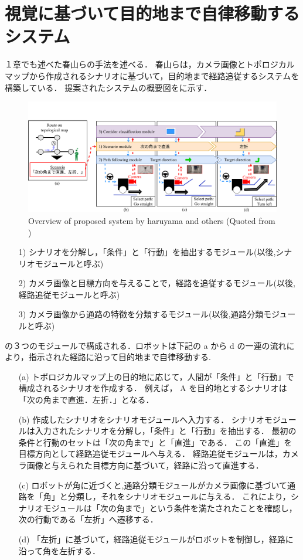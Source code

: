 \section{視覚に基づいて目的地まで自律移動するシステム}
１章でも述べた春山らの手法を述べる．
春山らは，カメラ画像とトポロジカルマップから作成されるシナリオに基づいて，目的地まで経路追従するシステムを構築している．
提案されたシステムの概要図をに示す．

\begin{figure}[htbp]
  \centering
   \includegraphics[width=130mm]{images/pdf/haruyama/system.pdf}
   \caption[Overview of proposed system by haruyama and others]{Overview of proposed system by haruyama and others (Quoted from \cite{haruyama2023})}
   \label{fig:sys}
\end{figure}

\begin{enumerate}
  \item [1)]シナリオを分解し，「条件」と「行動」を抽出するモジュール(以後,シナリオモジュールと呼ぶ)
  \item [2)]カメラ画像と目標方向を与えることで，経路を追従するモジュール(以後,経路追従モジュールと呼ぶ)
  \item [3)]カメラ画像から通路の特徴を分類するモジュール(以後,通路分類モジュールと呼ぶ)
\end{enumerate}

の３つのモジュールで構成される．ロボットは下記の a から d の一連の流れにより，指示された経路に沿って目的地まで自律移動する.
\begin{enumerate}
  \item [(a)] 
  トポロジカルマップ上の目的地に応じて，人間が「条件」と「行動」で構成されるシナリオを作成する．
  例えば， A を目的地とするシナリオは「次の角まで直進．左折．」となる．
  \item [(b)] 
  作成したシナリオをシナリオモジュールへ入力する．
  シナリオモジュールは入力されたシナリオを分解し，「条件」と「行動」を抽出する．
  最初の条件と行動のセットは「次の角まで」と「直進」である．
  この「直進」を目標方向として経路追従モジュールへ与える．
  経路追従モジュールは，カメラ画像と与えられた目標方向に基づいて，経路に沿って直進する．
  \item [(c)] 
  ロボットが角に近づくと,通路分類モジュールがカメラ画像に基づいて通路を「角」と分類し，それをシナリオモジュールに与える．
  これにより，シナリオモジュールは「次の角まで」という条件を満たされたことを確認し，次の行動である「左折」へ遷移する．
  \item [(d)]
  「左折」に基づいて，経路追従モジュールがロボットを制御し，経路に沿って角を左折する．
\end{enumerate}

